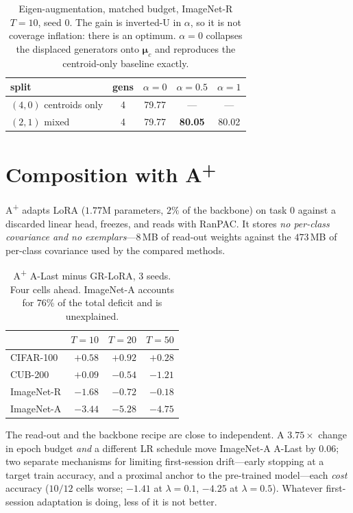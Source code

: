 \documentclass[10pt,twocolumn]{article}
\newcommand{\bmu}{\boldsymbol{\mu}}
\begin{document}
\begin{table}[t]\centering\small
\begin{tabular}{lcccc}
\toprule
split & gens & $\alpha{=}0$ & $\alpha{=}0.5$ & $\alpha{=}1$ \\
\midrule
$(4,0)$ centroids only & 4 & 79.77 & --- & --- \\
$(2,1)$ mixed          & 4 & 79.77 & \textbf{80.05} & 80.02 \\
\bottomrule
\end{tabular}
\caption{Eigen-augmentation, matched budget, ImageNet-R $T{=}10$, seed 0. The
gain is inverted-U in $\alpha$, so it is not coverage inflation: there is an
optimum. $\alpha{=}0$ collapses the displaced generators onto $\bmu_c$ and
reproduces the centroid-only baseline exactly.}
\label{tab:eigen}
\end{table}

\section{Composition with A\textsuperscript{+}}

A\textsuperscript{+} adapts LoRA ($1.77$M parameters, $2\%$ of the backbone) on
task 0 against a discarded linear head, freezes, and reads with RanPAC. It stores
\emph{no per-class covariance and no exemplars}---$8$\,MB of read-out weights
against the $473$\,MB of per-class covariance used by the compared methods.

\begin{table}[t]\centering\small
\begin{tabular}{lrrr}
\toprule
 & $T{=}10$ & $T{=}20$ & $T{=}50$ \\
\midrule
CIFAR-100   & $\mathbf{+0.58}$ & $\mathbf{+0.92}$ & $\mathbf{+0.28}$ \\
CUB-200     & $\mathbf{+0.09}$ & $-0.54$ & $-1.21$ \\
ImageNet-R  & $-1.68$ & $-0.72$ & $-0.18$ \\
ImageNet-A  & $-3.44$ & $-5.28$ & $-4.75$ \\
\bottomrule
\end{tabular}
\caption{A\textsuperscript{+} A-Last minus GR-LoRA, 3 seeds. Four cells ahead.
ImageNet-A accounts for 76\% of the total deficit and is unexplained.}
\label{tab:aplus}
\end{table}

The read-out and the backbone recipe are close to independent. A $3.75\times$
change in epoch budget \emph{and} a different LR schedule move ImageNet-A A-Last
by $0.06$; two separate mechanisms for limiting first-session drift---early
stopping at a target train accuracy, and a proximal anchor to the pre-trained
model---each \emph{cost} accuracy ($10/12$ cells worse; $-1.41$ at $\lambda{=}0.1$,
$-4.25$ at $\lambda{=}0.5$). Whatever first-session adaptation is doing, less of
it is not better.
\end{document}
